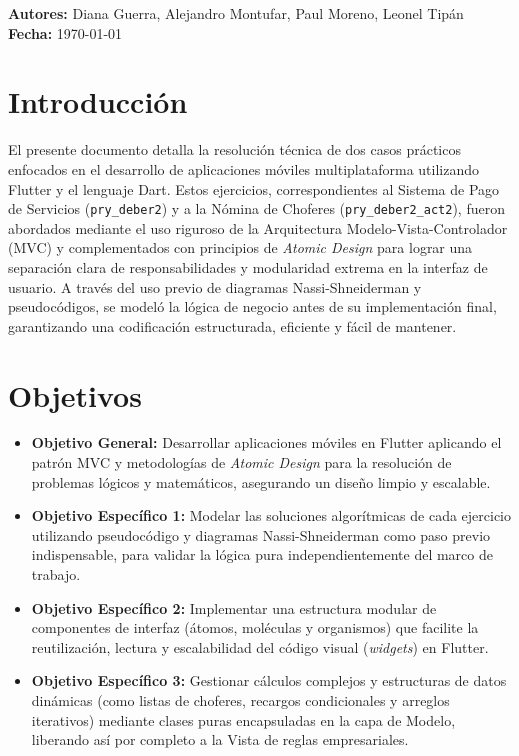 \documentclass[12pt, a4paper]{article}
\begin{document}
\begin{titlepage}
\vfill
\begin{tcolorbox}[
    enhanced,
    width=\linewidth,
    colback=black!3,
    colframe=black!20,
    boxrule=0.5pt,
    arc=4pt,
    left=12pt,
    right=12pt,
    top=10pt,
    bottom=10pt
]
\color{black}
\textbf{Autores:}  Diana Guerra, Alejandro Montufar, Paul Moreno, Leonel Tipán\\[4pt]
\textbf{Fecha:} \today
\end{tcolorbox}
\end{titlepage}

\tableofcontents
\newpage

\section{Introducción}
El presente documento detalla la resolución técnica de dos casos prácticos enfocados en el desarrollo de aplicaciones móviles multiplataforma utilizando Flutter y el lenguaje Dart. Estos ejercicios, correspondientes al Sistema de Pago de Servicios (\texttt{pry\_deber2}) y a la Nómina de Choferes (\texttt{pry\_deber2\_act2}), fueron abordados mediante el uso riguroso de la Arquitectura Modelo-Vista-Controlador (MVC) y complementados con principios de \textit{Atomic Design} para lograr una separación clara de responsabilidades y modularidad extrema en la interfaz de usuario. A través del uso previo de diagramas Nassi-Shneiderman y pseudocódigos, se modeló la lógica de negocio antes de su implementación final, garantizando una codificación estructurada, eficiente y fácil de mantener.

\section{Objetivos}
\begin{itemize}
    \item \textbf{Objetivo General:} Desarrollar aplicaciones móviles en Flutter aplicando el patrón MVC y metodologías de \textit{Atomic Design} para la resolución de problemas lógicos y matemáticos, asegurando un diseño limpio y escalable.
    \item \textbf{Objetivo Específico 1:} Modelar las soluciones algorítmicas de cada ejercicio utilizando pseudocódigo y diagramas Nassi-Shneiderman como paso previo indispensable, para validar la lógica pura independientemente del marco de trabajo.
    \item \textbf{Objetivo Específico 2:} Implementar una estructura modular de componentes de interfaz (átomos, moléculas y organismos) que facilite la reutilización, lectura y escalabilidad del código visual (\textit{widgets}) en Flutter.
    \item \textbf{Objetivo Específico 3:} Gestionar cálculos complejos y estructuras de datos dinámicas (como listas de choferes, recargos condicionales y arreglos iterativos) mediante clases puras encapsuladas en la capa de Modelo, liberando así por completo a la Vista de reglas empresariales.
\end{itemize}
\end{document}
